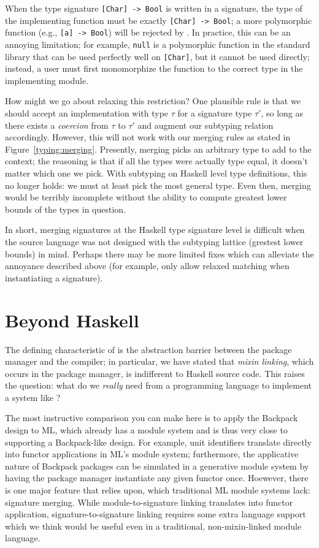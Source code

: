 When the type signature \verb|[Char] -> Bool| is written in a signature,
the type of the implementing function must be exactly \verb|[Char] -> Bool|;
a more polymorphic function (e.g., \verb|[a] -> Bool|) will be rejected
by \Backpack{}.
In practice, this can be an annoying limitation; for example, \verb|null|
is a polymorphic function in the standard library that can be used
perfectly well on \verb|[Char]|, but it cannot be used directly; instead,
a user must first monomorphize the function to the correct type in the
implementing module.

How might we go about relaxing this restriction?  One plausible rule is
that we should accept an implementation with type $\tau$ for a signature
type $\tau'$, so long as there exists a \emph{coercion} from $\tau$ to
$\tau'$ and augment our subtyping relation accordingly.  However, this will
not work with our merging rules as stated in Figure~\ref{typing:merging}.
Presently, merging picks an arbitrary type to add to the context; the reasoning
is that if all the types were actually type equal, it doesn't matter which
one we pick.  With subtyping on Haskell level type definitions, this no
longer holds: we must at least pick the most general type.  Even then,
merging would be terribly incomplete without the ability to compute
greatest lower bounds of the types in question.

In short, merging signatures at the Haskell type signature level is difficult
when the source language was not designed with the subtyping lattice (grestest
lower bounds) in mind.  Perhaps there may be more limited fixes which can
alleviate the annoyance described above (for example, only allow relaxed
matching when instantiating a signature).

\label{sec:beyond-haskell}
\section{Beyond Haskell}

The defining characteristic of \Backpack{} is the abstraction barrier
between the package manager and the compiler; in particular, we have
stated that \emph{mixin linking}, which occurs in the package manager,
is indifferent to Haskell source code.  This raises the question: what
do we \emph{really} need from a programming language to implement
a system like \Backpack{}?

The most instructive comparison you can make here is to apply the
Backpack design to ML, which already has a module system and is
thus very close to supporting a Backpack-like design.  For example,
unit identifiers translate directly into functor applications in
ML's module system; furthermore, the applicative nature of
Backpack packages can be simulated in a generative module system
by having the package manager instantiate any given functor once.
Hoewever, there is one major feature that \Backpack{} relies
upon, which traditional ML module systems lack: signature merging.
While module-to-signature linking translates into functor application,
signature-to-signature linking requires some extra language support
which we think would be useful even in a traditional, non-mixin-linked
module language.

